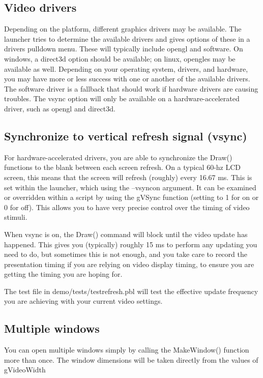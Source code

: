 \subsection{Video drivers}
Depending on the platform, different graphics drivers may be available.  The launcher tries to determine the available drivers and gives options of these in a drivers pulldown menu. These will typically include opengl and software. On windows, a direct3d option should be available; on linux, opengles may be available as well.   Depending on your operating system, drivers, and hardware, you may have more or less success with one or another of the available drivers.  The software driver is a fallback that should work if hardware drivers are causing troubles.  The vsync option will only be available on a hardware-accelerated driver, such as opengl and direct3d.


\subsection{Synchronize to vertical refresh signal (vsync)}
For hardware-accelerated drivers, you are able to synchronize the Draw() functions to the blank between each screen refresh.  On a typical 60-hz LCD screen, this means that the screen will refresh (roughly) every 16.67 ms. This is set within the launcher, which using the --vsyncon argument.  It can be examined or overridden within a script by using the gVSync function (setting to 1 for on or 0 for off).  This allows you to have very precise control over the timing of video stimuli.

When vsync is on, the Draw() command will block until the video update has happened.  This gives you (typically) roughly 15 ms to perform any updating you need to do, but sometimes this is not enough, and you take care to record the presentation timing if you are relying on video display timing, to ensure you are getting the timing you are hoping for.

The test file in demo/tests/testrefresh.pbl will test the effective update frequency you are achieving with your current video settings. 

\subsection{Multiple windows}
You can open multiple windows simply by calling the MakeWindow() function more than once.  The window dimensions will be taken directly from the values of gVideoWidth



